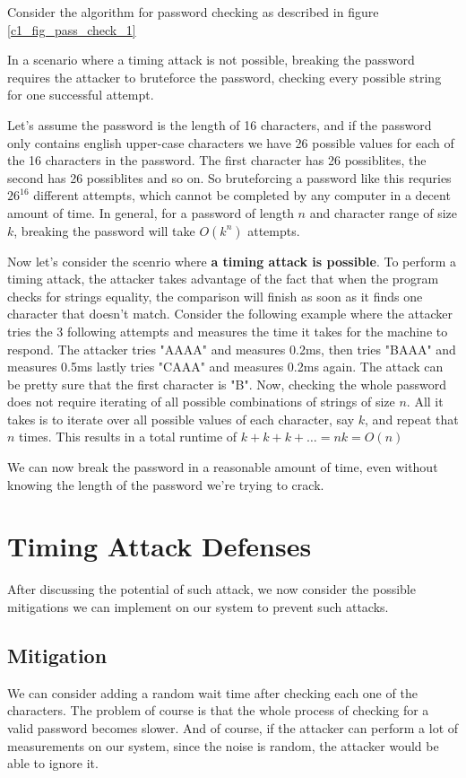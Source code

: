 Consider the algorithm for password checking as described in figure
\ref{c1_fig_pass_check_1}

In a scenario where a timing attack is not possible, breaking the password
 requires the attacker to bruteforce the password, checking every
 possible string for one successful attempt.

Let's assume the password is the length of 16 characters, and if the password only contains english
upper-case characters we have 26 possible values for each of the 16 characters
in the password. The first character has 26 possiblites, the second has 26
possiblites and so on. So bruteforcing a password like this requries ${26}^{16}$
different attempts, which cannot be completed by any computer in a decent amount
of time. In general, for a password of length $n$ and character range of size
$k$, breaking the password will take $O({k}^{n})$ attempts.

Now let's consider the scenrio where \textbf{a timing attack is possible}. To
perform a timing attack, the attacker takes advantage of the fact that when the
program checks for strings equality, the comparison will finish as soon as it
finds one character that doesn't match. Consider the following example where the
attacker tries the 3 following attempts and measures the time it takes for the
machine to respond. The attacker tries "AAAA" and measures 0.2ms, then tries
"BAAA" and measures 0.5ms lastly tries "CAAA" and measures 0.2ms again. The
attack can be pretty sure that the first character is "B". Now, checking the
whole password does not require iterating of all possible combinations of
strings of size $n$. All it takes is to iterate over all possible values of each
character, say $k$, and repeat that $n$ times. This results in a total runtime
of $k+k+k+\dots = nk = O(n)$

We can now break the password in a reasonable amount of time, even without
knowing the length of the password we're trying to crack.

\section{Timing Attack Defenses}
After discussing the potential of such attack, we now consider the possible
mitigations we can implement on our system to prevent such attacks.

\subsection{Mitigation}
We can consider adding a random wait time after checking each one of the
characters. The problem of course is that the whole process of checking for a valid
password becomes slower. And of course, if the attacker can perform a lot of
measurements on our system, since the noise is random, the attacker would be
able to ignore it.


